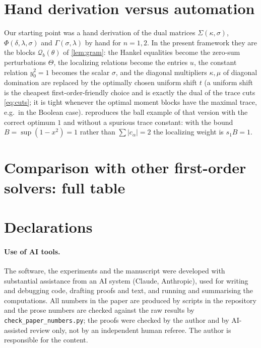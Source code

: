 \documentclass[a4paper,11pt]{article}
\newcommand{\fitbox}[1]{\sbox{\tabbox}{#1}\ifdim\wd\tabbox>\textwidth\resizebox{\textwidth}{!}{\usebox{\tabbox}}\else\usebox{\tabbox}\fi}
\theoremstyle{plain}
\theoremstyle{definition}
\theoremstyle{remark}
\begin{document}
\section{Hand derivation versus automation}\label{app:hand}
Our starting point was a hand derivation of the dual matrices $\Sigma(\kappa,\sigma)$, $\Phi(\delta,\lambda,\sigma)$ and $\Gamma(\sigma,\lambda)$ by hand for $n=1,2$. In the present framework they are the blocks $\mathcal Q_b(\theta)$ of \cref{lem:gram}: the Hankel equalities become the zero-sum perturbations $\Theta$, the localizing relations become the entries $u$, the constant relation $y_0^2=1$ becomes the scalar $\sigma$, and the diagonal multipliers $\kappa,\mu$ of diagonal domination are replaced by the optimally chosen uniform shift $t$ (a uniform shift is the cheapest first-order-friendly choice and is exactly the dual of the trace cuts \eqref{eq:cuts}; it is tight whenever the optimal moment blocks have the maximal trace, e.g.\ in the Boolean case).  reproduces the ball example of that version with the correct optimum $1$ and without a spurious trace constant: with the bound $B=\sup(1-x^2)=1$ rather than $\sum|c_\alpha|=2$ the localizing weight is $s_1B=1$.


\section{Comparison with other first-order solvers: full table}
\begin{table}[h]\centering\scriptsize
\setlength{\tabcolsep}{2.5pt}
\fitbox{}
\caption{Order-$2$ MAX-CUT, random $3$-regular graphs. $t_{10^{-k}}$: time to reach $|{\rm value}-{\rm ref}|\le10^{-k}$ (and, for CGAL/BM, constraint violation $\le10^{-k}$); n.r.: not reached within the $1200$\,s budget. ``signed err.'' is the final value minus the reference, ``max viol.'' the final maximal constraint violation (zero for ours: certified bound). At $n=40$ the reference is our own final value $54.0065$ (MOSEK is killed). Baseline parameters were tuned per instance using the reference.}\label{tab:baselines}
\end{table}

\section*{Declarations}
\paragraph{Use of AI tools.} The software, the experiments and the manuscript were developed with substantial assistance from an AI system (Claude, Anthropic), used for writing and debugging code, drafting proofs and text, and running and summarising the computations. All numbers in the paper are produced by scripts in the repository and the prose numbers are checked against the raw results by \texttt{check\_paper\_numbers.py}; the proofs were checked by the author and by AI-assisted review only, not by an independent human referee. The author is responsible for the content.
\end{document}
